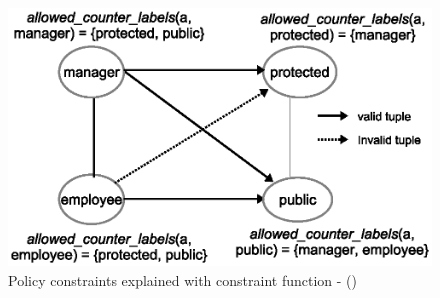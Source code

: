 
 	\begin{figure} 
 		\centering
 		\includegraphics[width=.4\textwidth]{bound-function-explained}
 		\caption{Policy constraints explained with constraint function - \allowedLabels()}
 		\label{fig:bound-function-explained}
 	\end{figure}